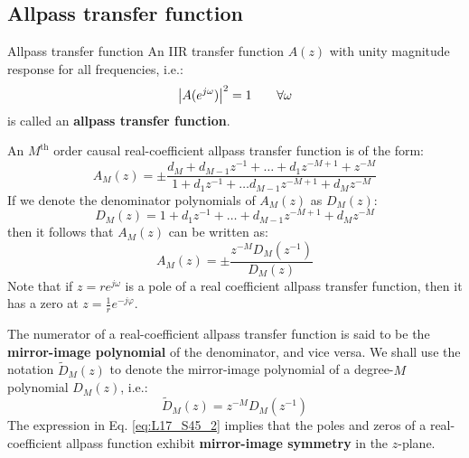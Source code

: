 \documentclass[../../main/main.tex]{subfiles}
\begin{document}
\subsection{Allpass transfer function}
\begin{definition}{Allpass transfer function}{}
    An IIR transfer function \( A(z) \) with unity magnitude response for all frequencies, i.e.:
    \begin{equation}
        \abs{A(e^{j\omega})}^{2}
        =
        1
        \qquad
        \forall \omega
        \label{eq:L17_S44_1}
    \end{equation}
    is called an \textbf{allpass transfer function}.
\end{definition}

An \( M^{\text{th}} \) order causal real-coefficient allpass transfer function is of the form:
\begin{equation}
    A_{M}(z)
    =
    \pm \frac{d_{M} + d_{M-1}z^{-1} + \dots + d_{1}z^{-M+1} + z^{-M}}{1 + d_{1}z^{-1} + \dots d_{M-1}z^{-M+1} + d_{M}z^{-M}}
    \label{eq:L17_S44_2}
\end{equation}
If we denote the denominator polynomials of \( A_{M}(z) \) as \( D_{M}(z) \):
\begin{equation}
    D_{M}(z)
    =
    1 + d_{1}z^{-1} + \dots + d_{M-1}z^{-M+1} + d_{M}z^{-M}
    \label{eq:L17_S45_1}
\end{equation}
then it follows that \( A_{M}(z) \) can be written as:
\begin{equation}
    A_{M}(z)
    =
    \pm \frac{z^{-M}D_{M}(z^{-1})}{D_{M}(z)}
    \label{eq:L17_S45_2}
\end{equation}
Note that if \( z = re^{j\omega} \) is a pole of a real coefficient allpass transfer function, then it has a zero at \( z = \frac{1}{r} e^{-j \varphi} \).

The numerator of a real-coefficient allpass transfer function is said to be the \textbf{mirror-image polynomial} of the denominator, and vice versa.
We shall use the notation \( \widetilde{D}_{M}(z) \) to denote the mirror-image polynomial of a degree-\( M \) polynomial \( D_{M}(z) \), i.e.:
\begin{equation}
    \widetilde{D}_{M}(z)
    =
    z^{-M} D_{M}(z^{-1})
    \label{eq:L17_S46_1}
\end{equation}
The expression in Eq. \ref{eq:L17_S45_2} implies that the poles and zeros of a real-coefficient allpass function exhibit \textbf{mirror-image symmetry} in the \( z \)-plane.
\end{document}
